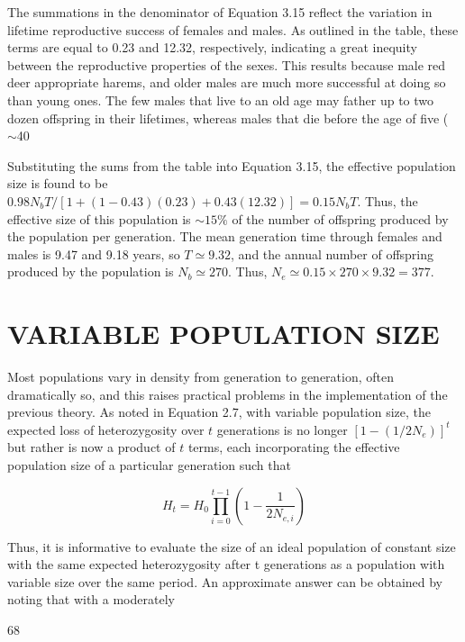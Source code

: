 \documentclass{article}
\begin{document}
The summations in the denominator of Equation 3.15 reflect the variation in lifetime reproductive success of females and males. As outlined in the table, these terms are equal to 0.23 and 12.32, respectively, indicating a great inequity between the reproductive properties of the sexes. This results because male red deer appropriate harems, and older males are much more successful at doing so than young ones. The few males that live to an old age may father up to two dozen offspring in their lifetimes, whereas males that die before the age of five ( $ \sim $40%

Substituting the sums from the table into Equation 3.15, the effective population size is found to be  $ 0.98N_bT/[1+(1-0.43)(0.23)+0.43(12.32)]=0.15N_bT $. Thus, the effective size of this population is  $ \sim15\% $ of the number of offspring produced by the population per generation. The mean generation time through females and males is 9.47 and 9.18 years, so  $ T\simeq9.32 $, and the annual number of offspring produced by the population is  $ N_b\simeq270 $. Thus,  $ N_e\simeq0.15\times270\times9.32=377 $.

\section{VARIABLE POPULATION SIZE}
Most populations vary in density from generation to generation, often dramatically so, and this raises practical problems in the implementation of the previous theory. As noted in Equation 2.7, with variable population size, the expected loss of heterozygosity over  $ t $ generations is no longer  $ [1 - (1/2N_e)]^t $ but rather is now a product of  $ t $ terms, each incorporating the effective population size of a particular generation such that

\begin{equation}
H_{t}=H_{0}\prod_{i=0}^{t-1}\left(1-\frac{1}{2N_{e,i}}\right)
\tag{3.16}
\label{eq:3_16}
\end{equation}

Thus, it is informative to evaluate the size of an ideal population of constant size with the same expected heterozygosity after t generations as a population with variable size over the same period. An approximate answer can be obtained by noting that with a moderately

68
\end{document}

